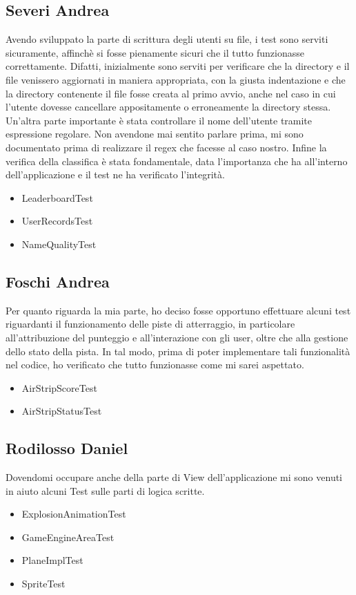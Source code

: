 \documentclass[a4paper,12pt]{report}
\begin{document}
\subsection{Severi Andrea}
Avendo sviluppato la parte di scrittura degli utenti su file, i test sono serviti sicuramente, affinchè si fosse pienamente sicuri che il tutto funzionasse correttamente. Difatti, inizialmente sono serviti per
verificare che la directory e il file venissero aggiornati in maniera appropriata, con la giusta indentazione e che la directory contenente il file fosse creata al primo avvio, anche nel caso in cui l'utente dovesse cancellare appositamente o erroneamente la directory stessa. Un'altra parte importante è stata controllare il nome dell'utente tramite espressione regolare. Non avendone mai sentito parlare prima, mi sono documentato prima di realizzare il regex che facesse al caso nostro. Infine la verifica della classifica è stata fondamentale, data l'importanza che ha all'interno dell'applicazione e il test ne ha verificato l'integrità.
\begin{itemize}
    \item LeaderboardTest
    \item UserRecordsTest
    \item NameQualityTest
\end{itemize}

\subsection{Foschi Andrea}
Per quanto riguarda la mia parte, ho deciso fosse opportuno effettuare alcuni test riguardanti il funzionamento delle piste di atterraggio, in particolare all’attribuzione del punteggio e all’interazione con gli user, oltre che alla gestione dello stato della pista. In tal modo, prima di poter implementare tali funzionalità nel codice, ho verificato che tutto funzionasse come mi sarei aspettato.
\begin{itemize}
    \item AirStripScoreTest
    \item AirStripStatusTest
\end{itemize}

\subsection{Rodilosso Daniel}
Dovendomi occupare anche della parte di View dell’applicazione mi sono venuti in aiuto alcuni Test sulle parti di logica scritte.
\begin{itemize}
	\item ExplosionAnimationTest
	\item GameEngineAreaTest
    \item PlaneImplTest
    \item SpriteTest
\end{itemize}
\end{document}
